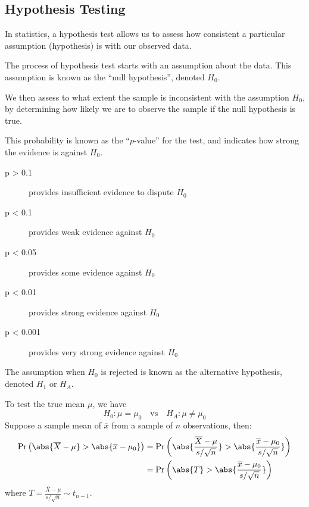 \documentclass{article}
\begin{document}
\subsection{Hypothesis Testing}
\begin{definition}
    In statistics, a hypothesis test allows us to assess how
    consistent a particular assumption (hypothesis) is with our
    observed data.

    The process of hypothesis test starts with an assumption about the
    data. This assumption is known as the ``null hypothesis'', denoted \(H_0\).

    We then assess to what extent the sample is inconsistent with the assumption \(H_0\),
    by determining how likely we are to observe the sample if the null hypothesis is true.

    This probability is known as the ``\(p\)-value'' for the test, and indicates how strong the
    evidence is against \(H_0\).
    \begin{description}
        \item[p > 0.1] provides insufficient evidence to dispute \(H_0\)
        \item[p < 0.1] provides weak evidence against \(H_0\)
        \item[p < 0.05] provides some evidence against \(H_0\)
        \item[p < 0.01] provides strong evidence against \(H_0\)
        \item[p < 0.001] provides very strong evidence against \(H_0\)
    \end{description}
    The assumption when \(H_0\) is rejected is known as the alternative hypothesis, denoted \(H_1\) or \(H_A\).

    To test the true mean \(\mu \), we have
    \begin{equation*}
        H_0:\mu = \mu_0 \quad \text{vs} \quad H_A:\mu \neq \mu_0
    \end{equation*}
    Suppose a sample mean of \(\overline{x}\) from a sample of \(n\) observations, then:
    \begin{align*}
        \Pr{\left( \abs{\overline{X} - \mu} > \abs{\overline{x} - \mu_0} \right)} & = \Pr{\left( \abs{\frac{\overline{X} - \mu}{s/\sqrt{n}}} > \abs{\frac{\overline{x} - \mu_0}{s/\sqrt{n}}} \right)} \\
                                                                                  & = \Pr{\left( \abs{T} > \abs{\frac{\overline{x} - \mu_0}{s/\sqrt{n}}} \right)}
    \end{align*}
    where \(T=\frac{\overline{X} - \mu}{s/\sqrt{n}}\sim t_{n-1}\).
\end{definition}
\end{document}
